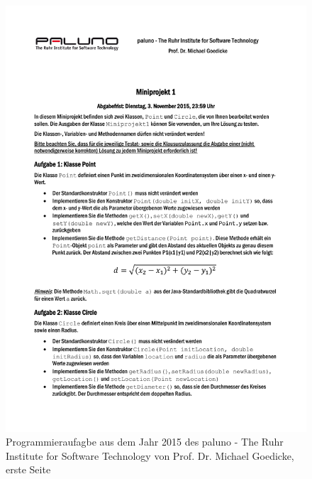 \begin{figure} %
	\centering
	\includegraphics[width=1.0\textwidth]{images/Miniprojekt-1-S.1.pdf}
	\caption{Programmieraufagbe aus dem Jahr 2015 des paluno - The Ruhr Institute for Software Technology von Prof. Dr. Michael Goedicke, erste Seite}
	\label{abb:Miniprojekt-1-S.1}
\end{figure}

